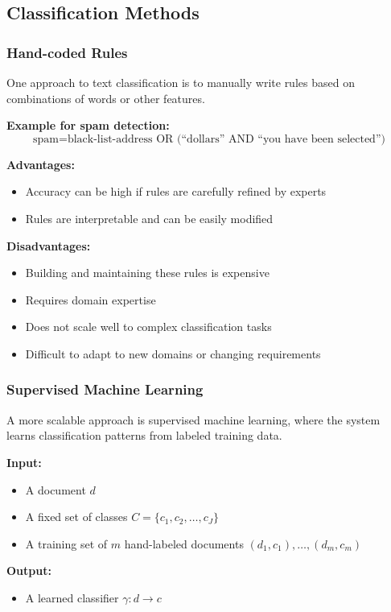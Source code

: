 \documentclass[11pt,a4paper]{article}
\theoremstyle{definition}
\theoremstyle{plain}
\theoremstyle{remark}
\begin{document}
\subsection{Classification Methods}

\subsubsection{Hand-coded Rules}

One approach to text classification is to manually write rules based on combinations of words or other features.

\textbf{Example for spam detection:}
\[
\text{spam} = \text{black-list-address OR (``dollars'' AND ``you have been selected'')}
\]

\textbf{Advantages:}
\begin{itemize}
    \item Accuracy can be high if rules are carefully refined by experts
    \item Rules are interpretable and can be easily modified
\end{itemize}

\textbf{Disadvantages:}
\begin{itemize}
    \item Building and maintaining these rules is expensive
    \item Requires domain expertise
    \item Does not scale well to complex classification tasks
    \item Difficult to adapt to new domains or changing requirements
\end{itemize}

\subsubsection{Supervised Machine Learning}

A more scalable approach is supervised machine learning, where the system learns classification patterns from labeled training data.

\begin{tcolorbox}[colback=green!5!white,colframe=green!75!black,title=\textbf{Supervised Machine Learning for Text Classification}]
\textbf{Input:}
\begin{itemize}
    \item A document $d$
    \item A fixed set of classes $C = \{c_1, c_2, \ldots, c_J\}$
    \item A training set of $m$ hand-labeled documents $(d_1, c_1), \ldots, (d_m, c_m)$
\end{itemize}

\textbf{Output:}
\begin{itemize}
    \item A learned classifier $\gamma: d \rightarrow c$
\end{itemize}
\end{tcolorbox}
\end{document}
